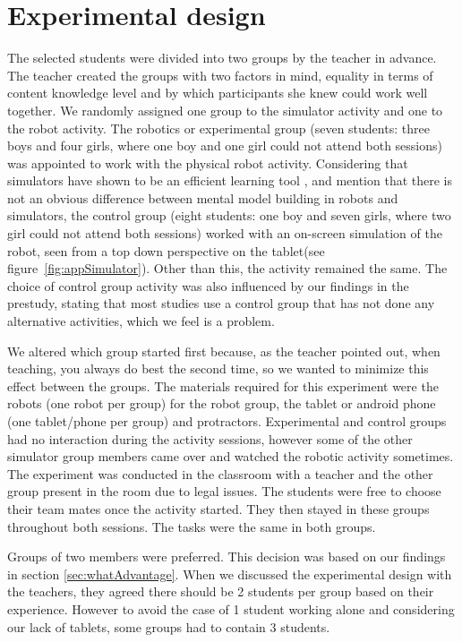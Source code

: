 \chapter{Experimental design}
The selected students were divided into two groups by the teacher in advance. 
The teacher created the groups with two factors in mind, equality in terms of content knowledge level and by which participants she knew could work well together.
We randomly assigned one group to the simulator activity and one to the robot activity. The robotics or experimental group (seven students: three boys and four girls, where one boy and one girl could not attend both sessions) was appointed to work with the physical robot activity. Considering that simulators have shown to be an efficient learning tool \cite{mitnik2009collaborative}, and  mention that there is not an obvious difference between mental model building in robots and simulators, the control group (eight students: one boy and seven girls, where two girl could not attend both sessions) worked with an on-screen simulation of the robot, seen from a top down perspective on the tablet(see figure~\ref{fig:appSimulator}). Other than this, the activity remained the same. 
The choice of control group activity was also influenced by our findings in the prestudy, stating that most studies use a control group that has not done any alternative activities, which we feel is a problem. 

\bigskip\noindent
We altered which group started first because, as the teacher pointed out, when teaching, you always do best the second time, so we wanted to minimize this effect between the groups. The materials required for this experiment were the robots (one robot per group) for the robot group, the tablet or android phone (one tablet/phone per group) and protractors. Experimental and control groups had no interaction during the activity sessions, however some of the other simulator group members came over and watched the robotic activity sometimes. 
The experiment was conducted in the classroom with a teacher and the other group present in the room due to legal issues. 
The students were free to choose their team mates once the activity started. They then stayed in these groups throughout both sessions. The tasks were the same in both groups.

\bigskip\noindent
Groups of two members were preferred. This decision was based on our findings in section \ref{sec:whatAdvantage}. When we discussed the experimental design with the teachers, they agreed there should be 2 students per group based on their experience. However to avoid the case of 1 student working alone and considering our lack of tablets, some groups had to contain 3 students.
